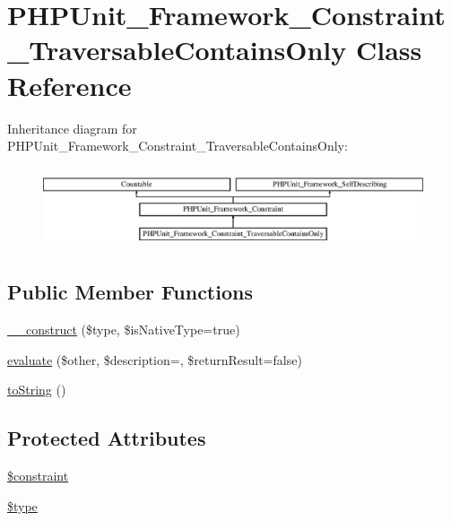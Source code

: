 \hypertarget{class_p_h_p_unit___framework___constraint___traversable_contains_only}{}\section{P\+H\+P\+Unit\+\_\+\+Framework\+\_\+\+Constraint\+\_\+\+Traversable\+Contains\+Only Class Reference}
\label{class_p_h_p_unit___framework___constraint___traversable_contains_only}
Inheritance diagram for P\+H\+P\+Unit\+\_\+\+Framework\+\_\+\+Constraint\+\_\+\+Traversable\+Contains\+Only\+:\begin{figure}[H]
\begin{center}
\leavevmode
\includegraphics[height=2.393162cm]{class_p_h_p_unit___framework___constraint___traversable_contains_only}
\end{center}
\end{figure}
\subsection*{Public Member Functions}
\begin{DoxyCompactItemize}
\item 
\mbox{\hyperlink{class_p_h_p_unit___framework___constraint___traversable_contains_only_abd41f377485d8ee29f44da7ed819cf6d}{\+\_\+\+\_\+construct}} (\$type, \$is\+Native\+Type=true)
\item 
\mbox{\hyperlink{class_p_h_p_unit___framework___constraint___traversable_contains_only_a4c184790087f7d42c3daf0d0180fe5fb}{evaluate}} (\$other, \$description=\textquotesingle{}\textquotesingle{}, \$return\+Result=false)
\item 
\mbox{\hyperlink{class_p_h_p_unit___framework___constraint___traversable_contains_only_a5558c5d549f41597377fa1ea8a1cefa3}{to\+String}} ()
\end{DoxyCompactItemize}
\subsection*{Protected Attributes}
\begin{DoxyCompactItemize}
\item 
\mbox{\hyperlink{class_p_h_p_unit___framework___constraint___traversable_contains_only_a50d9f10107fdcde72e77c91a07d654cd}{\$constraint}}
\item 
\mbox{\hyperlink{class_p_h_p_unit___framework___constraint___traversable_contains_only_a9a4a6fba2208984cabb3afacadf33919}{\$type}}
\end{DoxyCompactItemize}
